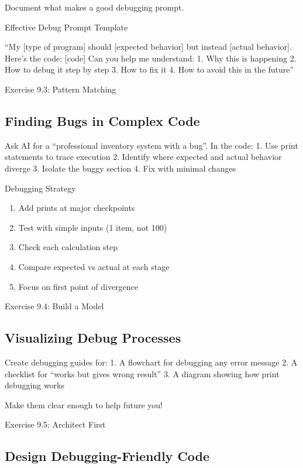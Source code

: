 \documentclass[
  letterpaper,
  DIV=11,
  numbers=noendperiod,
  oneside]{scrreprt}
\providecommand{\tightlist}{%
  \setlength{\itemsep}{0pt}\setlength{\parskip}{0pt}}\usepackage{longtable,booktabs,array}
\begin{document}
Document what makes a good debugging prompt.

Effective Debug Prompt Template

``My {[}type of program{]} should {[}expected behavior{]} but instead
{[}actual behavior{]}. Here's the code: {[}code{]} Can you help me
understand: 1. Why this is happening 2. How to debug it step by step 3.
How to fix it 4. How to avoid this in the future''

Exercise 9.3: Pattern Matching

\subsection{Finding Bugs in Complex
Code}\label{finding-bugs-in-complex-code}

Ask AI for a ``professional inventory system with a bug''. In the code:
1. Use print statements to trace execution 2. Identify where expected
and actual behavior diverge 3. Isolate the buggy section 4. Fix with
minimal changes

Debugging Strategy

\begin{enumerate}
\def\labelenumi{\arabic{enumi}.}
\tightlist
\item
  Add prints at major checkpoints
\item
  Test with simple inputs (1 item, not 100)
\item
  Check each calculation step
\item
  Compare expected vs actual at each stage
\item
  Focus on first point of divergence
\end{enumerate}

Exercise 9.4: Build a Model

\subsection{Visualizing Debug
Processes}\label{visualizing-debug-processes}

Create debugging guides for: 1. A flowchart for debugging any error
message 2. A checklist for ``works but gives wrong result'' 3. A diagram
showing how print debugging works

Make them clear enough to help future you!

Exercise 9.5: Architect First

\subsection{Design Debugging-Friendly
Code}\label{design-debugging-friendly-code}
\end{document}
